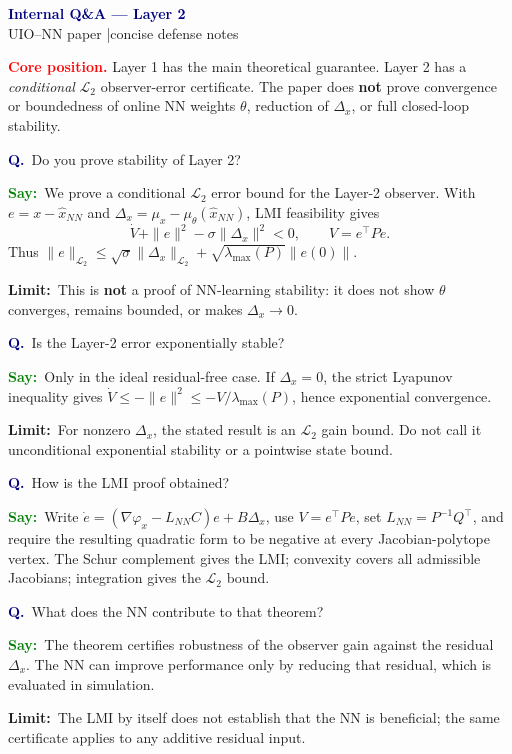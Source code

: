 \documentclass[10pt,a4paper]{article}
\newcommand{\qa}[1]{\vspace{1.2mm}\begin{questionbox}\textcolor{navy}{\textbf{Q.}}\ #1\end{questionbox}}
\newcommand{\say}[1]{\begin{saybox}\textcolor{green}{\textbf{Say:}}\ #1\end{saybox}}
\newcommand{\limit}[1]{\begin{limitbox}\textcolor{amber}{\textbf{Limit:}}\ #1\end{limitbox}}
\begin{document}
\begin{center}
  {\LARGE\bfseries\textcolor{navy}{Internal Q\&A --- Layer 2}}\\[1mm]
  {\small UIO--NN paper \quad|\quad concise defense notes}
\end{center}

\begin{tcolorbox}[colback=lightred,colframe=red,boxrule=.7pt,arc=1.5mm,
  left=3mm,right=3mm,top=2mm,bottom=2mm]
\textcolor{red}{\textbf{Core position.}} Layer 1 has the main theoretical guarantee. Layer 2 has a \emph{conditional} $\mathcal L_2$ observer-error certificate. The paper does \textbf{not} prove convergence or boundedness of online NN weights $\theta$, reduction of $\Delta_x$, or full closed-loop stability.
\end{tcolorbox}

\qa{Do you prove stability of Layer 2?}
\say{We prove a conditional $\mathcal L_2$ error bound for the Layer-2 observer. With $e= x-\hat x_{NN}$ and $\Delta_x=\mu_x-\mu_\theta(\hat x_{NN})$, LMI feasibility gives
\[
  \dot V+\|e\|^2-\sigma\|\Delta_x\|^2<0,\qquad V=e^\top P e.
\]
Thus $\|e\|_{\mathcal L_2}\leq\sqrt{\sigma}\|\Delta_x\|_{\mathcal L_2}+\sqrt{\lambda_{\max}(P)}\|e(0)\|$.}
\limit{This is \textbf{not} a proof of NN-learning stability: it does not show $\theta$ converges, remains bounded, or makes $\Delta_x\to0$.}

\qa{Is the Layer-2 error exponentially stable?}
\say{Only in the ideal residual-free case. If $\Delta_x=0$, the strict Lyapunov inequality gives $\dot V\leq-\|e\|^2\leq-V/\lambda_{\max}(P)$, hence exponential convergence.}
\limit{For nonzero $\Delta_x$, the stated result is an $\mathcal L_2$ gain bound. Do not call it unconditional exponential stability or a pointwise state bound.}

\qa{How is the LMI proof obtained?}
\say{Write $\dot e=(\nabla\varphi_x-L_{NN}C)e+B\Delta_x$, use $V=e^\top Pe$, set $L_{NN}=P^{-1}Q^\top$, and require the resulting quadratic form to be negative at every Jacobian-polytope vertex. The Schur complement gives the LMI; convexity covers all admissible Jacobians; integration gives the $\mathcal L_2$ bound.}

\qa{What does the NN contribute to that theorem?}
\say{The theorem certifies robustness of the observer gain against the residual $\Delta_x$. The NN can improve performance only by reducing that residual, which is evaluated in simulation.}
\limit{The LMI by itself does not establish that the NN is beneficial; the same certificate applies to any additive residual input.}
\end{document}
